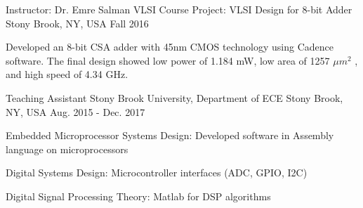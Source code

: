 \begin{cventries}
    \cventry
    {Instructor: Dr. Emre Salman} %
    {VLSI Course Project: VLSI Design for 8-bit Adder} %
    {Stony Brook, NY, USA} %
    {Fall 2016} %
    {
      \begin{cvitems} %
        \item Developed an 8-bit CSA adder with 45nm CMOS technology using Cadence 
        software. The final design showed low power of
        1.184 mW, low area of 1257 \(\mu m^2\) , and high speed of 4.34 GHz.
      \end{cvitems}
    }

  \cventry
    {Teaching Assistant} %
    {Stony Brook University, Department of ECE} %
    {Stony Brook, NY, USA} %
    {Aug. 2015 - Dec. 2017} %
    {
      \begin{cvitems} %
        \item Embedded Microprocessor Systems Design: Developed software in Assembly language on microprocessors 
        \item Digital Systems Design: Microcontroller interfaces (ADC, GPIO, I2C)
        \item Digital Signal Processing Theory: Matlab for DSP algorithms
      \end{cvitems}
    }

\end{cventries}
